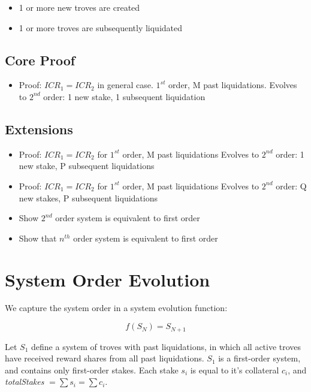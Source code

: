 \documentclass[reqno]{article}
\begin{document}
\begin{itemize}
  \item 1 or more new troves are created 
  \item 1 or more troves are subsequently liquidated
\end{itemize}

\subsection*{Core Proof}
\begin{itemize}
  \item Proof: $ICR_1=ICR_2$ in general case. $1^{st}$ order, M past liquidations. Evolves to $2^{nd}$ order: 1 new stake, 1 subsequent liquidation
\end{itemize}


\subsection*{Extensions}
\begin{itemize}
  \item Proof: $ICR_1=ICR_2$ for $1^{st}$ order, M past liquidations Evolves to $2^{nd}$ order: 1 new stake, P subsequent liquidations
  \item Proof: $ICR_1=ICR_2$ for $1^{st}$ order, M past liquidations Evolves to $2^{nd}$ order: Q new stakes, P subsequent liquidations
  \item Show $2^{nd}$ order system is equivalent to first order 
  \item Show that $n^{th}$ order system is equivalent to first order
\end{itemize}


\section{System Order Evolution}
We capture the system order in a system evolution function:

\begin{equation} 
    f(S_N)=S_{N+1}
\end{equation}

\bigskip
Let $S_1$ define a system of troves with past liquidations, in which all active troves have received reward shares from all past liquidations. $S_1$ is a first-order system, and contains only first-order stakes. Each stake $s_i$ is equal to it’s collateral $c_i$, and \textit{totalStakes} $= \sum s_i = \sum c_i$.\\
\end{document}
